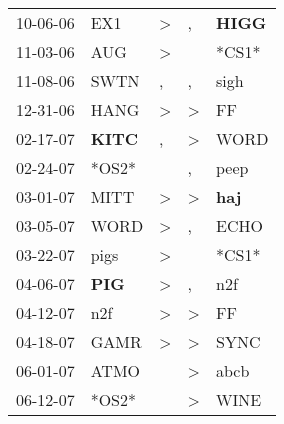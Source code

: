 \begin{supertabular}{p{0.07\textwidth}p{0.06\textwidth}p{0.02\textwidth}p{0.02\textwidth}p{0.06\textwidth}}
          10-06-06\textsuperscript{} &            EX1\textsuperscript{} &     \textgreater &                , &  \textbf{HIGG\textsuperscript{}} \\
          11-03-06\textsuperscript{} &            AUG\textsuperscript{} &     \textgreater &                  &                            *CS1* \\
          11-08-06\textsuperscript{} &           SWTN\textsuperscript{} &                , &                , &           sigh\textsuperscript{} \\
          12-31-06\textsuperscript{} &           HANG\textsuperscript{} &     \textgreater &     \textgreater &             FF\textsuperscript{} \\
          02-17-07\textsuperscript{} &  \textbf{KITC\textsuperscript{}} &                , &     \textgreater &           WORD\textsuperscript{} \\
          02-24-07\textsuperscript{} &                            *OS2* &                  &                , &           peep\textsuperscript{} \\
          03-01-07\textsuperscript{} &           MITT\textsuperscript{} &     \textgreater &     \textgreater &   \textbf{haj\textsuperscript{}} \\
          03-05-07\textsuperscript{} &           WORD\textsuperscript{} &     \textgreater &                , &           ECHO\textsuperscript{} \\
          03-22-07\textsuperscript{} &           pigs\textsuperscript{} &     \textgreater &                  &                            *CS1* \\
          04-06-07\textsuperscript{} &   \textbf{PIG\textsuperscript{}} &     \textgreater &                , &            n2f\textsuperscript{} \\
          04-12-07\textsuperscript{} &            n2f\textsuperscript{} &     \textgreater &     \textgreater &             FF\textsuperscript{} \\
          04-18-07\textsuperscript{} &           GAMR\textsuperscript{} &     \textgreater &     \textgreater &           SYNC\textsuperscript{} \\
          06-01-07\textsuperscript{} &           ATMO\textsuperscript{} &                  &     \textgreater &           abcb\textsuperscript{} \\
          06-12-07\textsuperscript{} &                            *OS2* &                  &     \textgreater &           WINE\textsuperscript{} \\

\end{supertabular}
